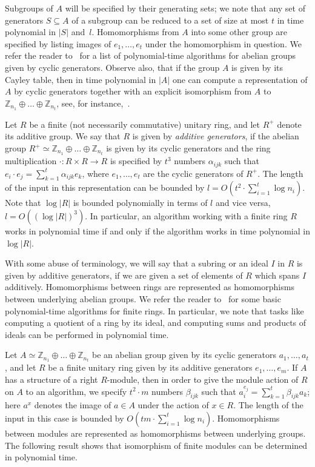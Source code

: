 \documentclass{article}
\begin{document}
Subgroups of \( A \) will be specified by their generating sets;
we note that any set of generators \( S \subseteq A \) of a subgroup can be reduced to a set of size at most \( t \) in time polynomial in \( |S| \) and~\( l \).
Homomorphisms from \( A \) into some other group are specified by listing images of \( e_1, \dots, e_t \) under the homomorphism in question.
We refer the reader to~\cite[Chapter~2]{iuliana-thesis} for a list of polynomial-time algorithms for abelian groups given by cyclic generators.
Observe also, that if the group \( A \) is given by its Cayley table, then in time polynomial in \( |A| \) one can compute a representation of \( A \) by cyclic generators
together with an explicit isomorphism from \( A \) to \( \mathbb{Z}_{n_1} \oplus \dots \oplus \mathbb{Z}_{n_t} \), see, for instance,~\cite{kayal}.

Let \( R \) be a finite (not necessarily commutative) unitary ring, 
and let \( R^+ \) denote its additive group. We say that \( R \) is given by \emph{additive generators},
if the abelian group \( R^+ \simeq \mathbb{Z}_{n_1} \oplus \dots \oplus \mathbb{Z}_{n_t} \) is given by its cyclic generators
and the ring multiplication \( \cdot : R \times R \to R \) is specified by \( t^3 \) numbers \( \alpha_{ijk} \) such that
\( e_i \cdot e_j = \sum_{k=1}^t \alpha_{ijk} e_k \), where \( e_1, \dots, e_t \) are the cyclic generators of \( R^+ \).
The length of the input in this representation can be bounded by \( l = O(t^2 \cdot \sum_{i=1}^t \log n_i) \).
Note that \( \log |R| \) is bounded polynomially in terms of \( l \) and vice versa, \( l = O((\log |R|)^3) \).
In particular, an algorithm working with a finite ring \( R \) works in polynomial time if and only if the algorithm works in time polynomial in \( \log |R| \).

With some abuse of terminology, we will say that a subring or an ideal \( I \) in \( R \) is given by additive generators,
if we are given a set of elements of \( R \) which spans \( I \) additively.
Homomorphisms between rings are represented as homomorphisms between underlying abelian groups.
We refer the reader to~\cite[Chapter~3]{iuliana-thesis} for some basic polynomial-time algorithms for finite rings.
In particular, we note that tasks like computing a quotient of a ring by its ideal, and computing sums and products of ideals
can be performed in polynomial time.

Let \( A \simeq \mathbb{Z}_{n_1} \oplus \dots \oplus \mathbb{Z}_{n_t} \)
be an abelian group given by its cyclic generators \( a_1, \dots, a_t \), and let \( R \) be a finite unitary ring
given by its additive generators \( e_1, \dots, e_m \). If \( A \) has a structure of a right \( R \)-module, then in order
to give the module action of \( R \) on \( A \) to an algorithm, we specify \( t^2 \cdot m \) numbers \( \beta_{ijk} \)
such that \( a_i^{e_j} = \sum_{k=1}^t \beta_{ijk} a_k \); here \( a^x \) denotes the image of \( a \in A \) under the action of \( x \in R \).
The length of the input in this case is bounded by \( O(tm \cdot \sum_{i=1}^t \log n_i) \).
Homomorphisms between modules are represented as homomorphisms between underlying groups.
The following result shows that isomorphism of finite modules can be determined in polynomial time.
\end{document}
